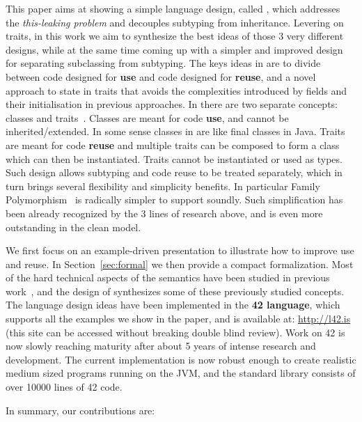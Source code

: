 This paper aims at showing a simple language design, called \name,
which addresses the \emph{this-leaking problem} and decouples subtyping from inheritance.
Levering on traits, in this work we aim to synthesize the best ideas
of those 3 very different designs, while at the same time coming up with a simpler and
improved design for separating subclassing from subtyping.
The keys ideas in \name are to divide between code designed for
\textbf{use} and code designed for \textbf{reuse}, and a novel
approach to state in traits that avoids the complexities introduced by
fields and their initialisation in previous approaches.
In \name there are two separate concepts: classes
and traits~\cite{ducasse2006traits}. Classes are meant for code \textbf{use}, and cannot be inherited/extended. In some sense classes in \name are like final classes in
Java. Traits are meant for code \textbf{reuse} and multiple traits can be
composed to form a class which can then be instantiated. Traits 
cannot be instantiated or used as types. Such design allows
subtyping and code reuse to be treated separately, which in turn
brings several flexibility and simplicity benefits. In particular 
Family Polymorphism~\cite{ernst2004expression} is
radically simpler to support soundly.
Such simplification has been already recognized by the 3 lines of
research above, and is even more outstanding in the clean \name model.

We first focus on an example-driven presentation to illustrate how to
improve use and reuse. 
In Section~\ref{sec:formal} we then provide a compact formalization.
Most of the hard technical aspects of the
semantics have been studied in previous 
work~\cite{Bettini:2010:ISP:1774088.1774530,BETTINI2013521,Bettini2015282,KrogdahlMS09,DBLP:journals/taosd/AxelsenSKM12,DBLP:conf/gpce/AxelsenK12,deep,servetto2014meta,fjig},
and the design of \name synthesizes some of these previously studied
concepts.
The language design ideas have been implemented in the {\bf 42 language}, which supports all
the examples we show in the paper, and is available at: \url{http://l42.is} (this site can be accessed without breaking double blind review).
Work on 42 is now slowly reaching maturity after about 5 years of
intense research and development. The current implementation 
is now robust enough to create realistic medium sized programs running 
on the JVM, and the standard library consists of over 10000 lines of
42 code. 

In summary, our contributions are:

